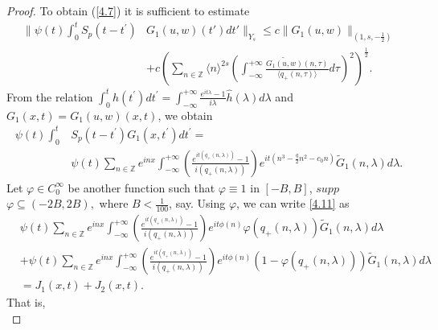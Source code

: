 \documentclass[reqno]{amsart}
\numberwithin{equation}{section}
\begin{document}
\begin{proof}

To obtain (\ref{4.7}) it is sufficient to estimate
\begin{equation}\label{4.10}
\begin{split}
\|\psi(t)\int\nolimits_{0}^{t}S_{p}(t-t^{\prime})&G_{1}(u,w)(t')dt'\| _{Y_{s}}
\le c\| G_{1}(u,w)\| _{(1,s,-\frac12)}\\
&+ c\left(\sum\limits_{n\in \mathbb{Z}}\langle n\rangle^{2s}\left(
\int_{-\infty}^{+\infty}
\frac{\widetilde{G_{1}(u,w)}(n,\tau)}{\langle
q_{+}(n,\tau)\rangle} d\tau\right)^{2}\right)^{\frac{1}{2}}.
\end{split}
\end{equation}
From the relation $\int_{0}^{t}h\left(  t^{\prime}\right)  dt^{\prime}=\int_{-\infty}^{+\infty}\frac{e^{it\lambda}-1}{i\lambda}\widehat{h}\left(
\lambda\right)  d\lambda$ and $G_{1}(x,t)=G_{1}(u,w)(x,t)$, we obtain
\begin{equation}\label{4.11}
\begin{split}
\psi(t)\int\nolimits_{0}^{t}&S_{p}(t-t^{\prime})G_{1}(x,t^{\prime})dt^{\prime}
=\\
&\psi(t)\sum\limits_{n\in\mathbb{Z}}e^{inx}\int_{-\infty}^{+\infty}\left(
\frac{e^{it\left(  q_{+}(n,\lambda)\right)
}-1}{i(q_{+}(n,\lambda))}\right)
e^{it\left(  n^{3}-\frac{q}{2}n^{2}-c_{0}n\right)  }\widetilde{G}_{1}(n,\lambda)d\lambda.
\end{split}
\end{equation}
Let $\varphi\in C_{0}^{\infty}$ be another function such that
$\varphi\equiv1$ in $[-B,B]$, $\mathit{supp}$
$\varphi\subseteq(-2B,2B),$  where
$B<\frac{1}{100}$, say. Using $\varphi$, we can write \eqref{4.11} as
\begin{equation*}
\begin{split}
&\psi(t)\sum\limits_{n\in\mathbb{Z}}e^{inx}\int_{-\infty}^{+\infty}
\left(\frac{e^{it\left(  q_{+}(n,\lambda)\right)}-1}{i(q_{+}(n,\lambda))}\right)
e^{it\phi(n)  }\varphi(q_{+}(n,\lambda))\widetilde{G}_{1}(n,\lambda)d\lambda\\
&
+\psi(t)\sum\limits_{n\in\mathbb{Z}}e^{inx}\int_{-\infty}^{+\infty}\left(
\frac{e^{it\left(  q_{+}(n,\lambda)\right)
}-1}{i(q_{+}(n,\lambda))}\right) e^{it\phi(n) }\left(  1-\varphi
(q_{+}(n,\lambda))\right)  \widetilde{G}_{1}(n,\lambda)d\lambda\\
&  =J_{1}(x,t)+J_{2}(x,t).
\end{split}
\end{equation*}
That is,
\begin{equation*}

\end{equation*}
\end{proof}
\end{document}
